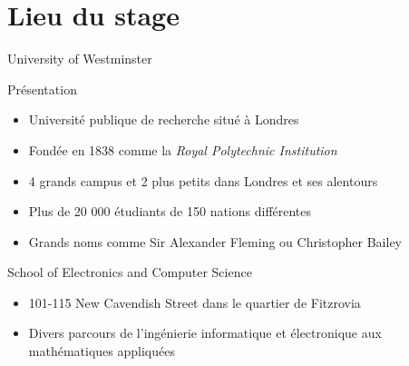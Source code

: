 \section{Lieu du stage}

\begin{frame}{University of Westminster}
	\begin{block}{Pr\'esentation}
		\begin{itemize}
			\item Universit\'e publique de recherche situ\'e \`a Londres
			\item Fond\'ee en 1838 comme la \textit{Royal Polytechnic Institution}
			\item 4 grands campus et 2 plus petits dans Londres et ses alentours
			\item Plus de 20 000 \'etudiants de 150 nations diff\'erentes
			\item Grands noms comme Sir Alexander Fleming ou Christopher Bailey

		\end{itemize}

	\end{block}

	\begin{block}{School of Electronics and Computer Science}
		\begin{itemize}
			\item 101-115 New Cavendish Street dans le quartier de Fitzrovia
			\item Divers parcours de l'ing\'enierie informatique et \'electronique aux math\'ematiques appliqu\'ees

		\end{itemize}

	\end{block}

\end{frame}


